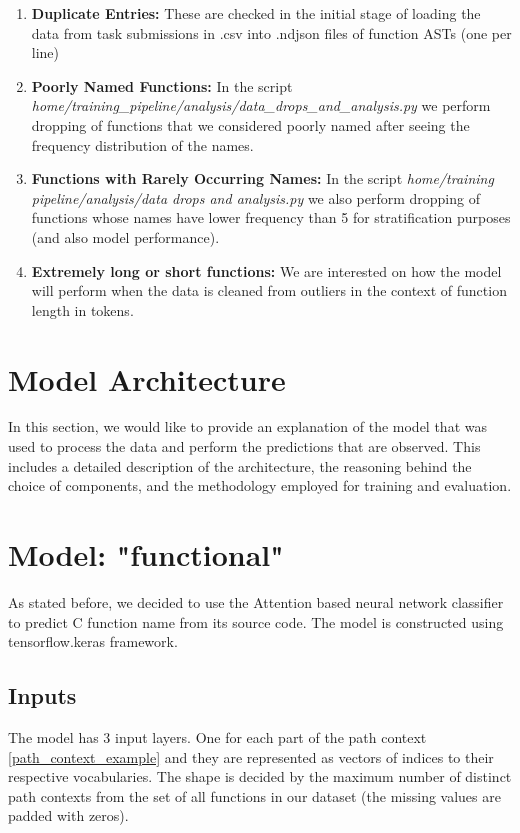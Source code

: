 \documentclass[10pt,english,a4paper]{report}
\begin{document}
\begin{enumerate}
    \item \textbf{Duplicate Entries:} These are checked in the initial  stage of loading the data from task submissions in .csv into .ndjson files of function ASTs (one per line)
    \item \textbf{Poorly Named Functions:} In the script \textit{home/training\_pipeline/analysis/data\_drops\_and\_analysis.py} we perform dropping of functions that we considered poorly named after seeing the frequency distribution of the names.
    \item \textbf{Functions with Rarely Occurring Names:}  In the script \textit{home/training pipeline/analysis/data drops and analysis.py} we also perform dropping of functions whose names have lower frequency than 5 for stratification purposes (and also model performance).
    \item \textbf{Extremely long or short functions:} We are interested on how the model will
    perform when the data is cleaned from outliers in the context of function length in tokens.
\end{enumerate}


\section{Model Architecture}
In this section, we would like to provide an explanation of the model that was used to process the data and perform the predictions that are observed. This includes a detailed description of the architecture, the reasoning behind the choice of components, and the methodology employed for training and evaluation.

\section*{Model: "functional"}
As stated before, we decided to use the Attention based neural network classifier to predict C function name from 
its source code. The model is constructed using tensorflow.keras framework.

\subsection{Inputs}
The model has 3 input layers. One for each part of the path context \ref{path_context_example} and they are represented as 
vectors of indices to their respective vocabularies. The shape is decided by the maximum
number of distinct path contexts from the set of all functions in our dataset (the missing values are 
padded with zeros).
\end{document}
